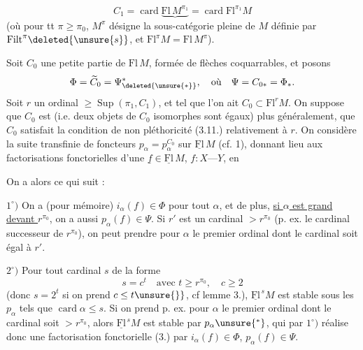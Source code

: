 
\[
C_1=\operatorname{card}\underbrace{\mathrm{Fl}\,M^{\pi_1}}=\operatorname{card}\mathrm{Fl}^{\pi_1}M
\]
(où pour tt $\pi\geq\pi_0$, $M^\pi$ désigne la sous-catégorie 
pleine de $M$ définie par $\mathrm{Filt}^\pi\deleted{\unsure{s}}$, et $\mathrm{Fl}^\pi M=\mathrm{Fl}\,M^\pi$).

Soit $C_0$ une petite partie de $\mathrm{Fl}\,M$, formée de
flèches coquarrables, et posons
\[
\Phi=\widetilde C_0=\Psi^{*}_{\deleted{\unsure{*}}},\quad\text{où}\quad\Psi=C_{0*}=\Phi_*.
\]
Soit $r$ un ordinal $\geq\operatorname{Sup}(\pi_1,C_1)$, et tel que l'on
ait $C_0\subset\mathrm{Fl}^rM$. On suppose que $C_0$ est 
(i.e. deux objets de $C_0$ isomorphes sont égaux)
plus généralement, que $C_0$ satisfait la 
condition de non pléthoricité (3.11.) relativement à $r$.
On considère la suite transfinie de foncteurs
$p_\alpha=p_\alpha^{C_0}$ sur $\underline{\mathrm{Fl}}\,M$ (cf.  1),  
 donnant lieu aux factorisations
fonctorielles d'une $\underline f\in\underline{\mathrm{Fl}}\,M$, $f:X\text{---}Y$, en

On a alors ce qui suit :

$1^\circ)$ On a (pour mémoire) $i_\alpha(f)\in\Phi$ pour tout $\alpha$, et
de plus, \uline{si $\alpha$ est grand devant $r^{\pi_0}$}, on a aussi
$p_\alpha(f)\in\Psi$. Si $r'$ est un cardinal $>r^{\pi_0}$ (p. ex. le
 cardinal successeur de $r^{\pi_0}$), on peut prendre
pour $\alpha$ le premier ordinal dont le cardinal soit égal
à $r'$.

$2^\circ)$  Pour
tout cardinal $s$ de la forme
\[
s=c^t\quad\text{avec }t\geq r^{\pi_0},\quad c\geq2
\]
(donc $s=2^t$ si on prend $c\leq t\unsure{\}}$, cf lemme 3.), $\underline{\mathrm{Fl}}^{\,s}M$
est stable sous les $p_\alpha$ tels que $\operatorname{card}\alpha\leq s$. Si on
prend p. ex. pour $\alpha$ le premier ordinal dont le
cardinal soit $>r^{\pi_0}$, alors $\underline{\mathrm{Fl}}^{\,s}M$ est stable par
$p_\alpha\unsure{{}^{*}}$, qui par $1^\circ)$ réalise donc une factorisation fonctorielle
(3.) par $i_\alpha(f)\in\Phi$, $p_\alpha(f)\in\Psi$.
